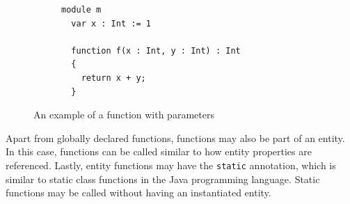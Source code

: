       \begin{figure}
        \begin{subfigure}[b]{0.4\textwidth}
          \begin{verbatim}
module m
  var x : Int := 1

  function f(x : Int, y : Int) : Int
  {
    return x + y;
  }
          \end{verbatim}
          \caption{\label{fig:webdsl-function-parameters-and-shadowing-example-webdsl}}
        \end{subfigure}
        \begin{subfigure}[b]{0.6\textwidth}
          \centering
          \caption{\label{fig:webdsl-function-parameters-and-shadowing-example-sg}}
        \end{subfigure}
        \caption{\label{fig:webdsl-function-parameters-and-shadowing-example}An example of a function with parameters}
      \end{figure}

      Apart from globally declared functions, functions may also be part of an entity. In this case, functions can be called similar to how entity properties are referenced. Lastly, entity functions may have the \texttt{static} annotation, which is similar to static class functions in the Java programming language. Static functions may be called without having an instantiated entity.

